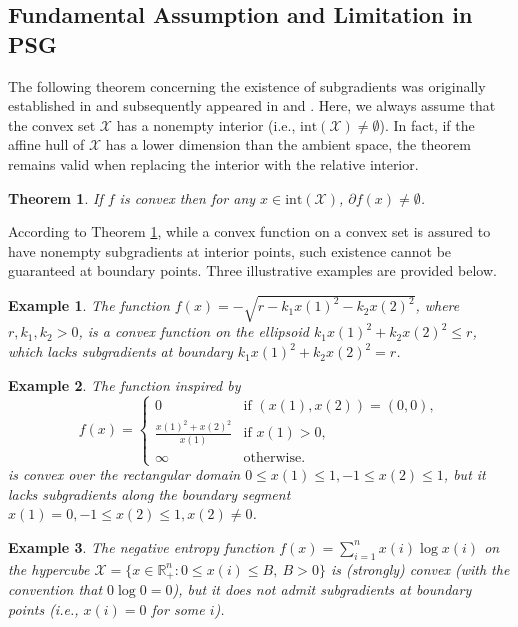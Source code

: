 \documentclass[sn-mathphys]{JORSC-jnl}%
\theoremstyle{thmstyleone}%
\newtheorem{theorem}{Theorem}[section]%
\newtheorem{example}{Example}%
\theoremstyle{thmstylethree}%
\def\R{{\mathbb R}}
\begin{document}
\subsection{Fundamental Assumption and Limitation in PSG}

The following theorem concerning the existence of subgradients was originally established in \cite[Theorem 23.4]{Rockafellar} and subsequently appeared in \cite[Proposition 1.1]{bubeck2015convex} and \cite[Theorem 3.1.15]{nesterov2018lectures}. Here, we always assume that the convex set $\mathcal{X}$ has a nonempty interior (i.e., $\text{int}(\mathcal{X}) \neq\emptyset$). In fact, if the affine hull of $\mathcal{X}$ has a lower dimension than the ambient space, the theorem remains valid when replacing the interior with the relative interior.

\begin{theorem}\label{thm1}
	If $f$ is convex then for any $x\in\text{int}(\mathcal{X})$, $\partial f(x)\neq\emptyset$.
\end{theorem}

According to Theorem \ref{thm1}, while a convex function on a convex set is assured to have nonempty subgradients at interior points, such existence cannot be guaranteed at boundary points. Three illustrative examples are provided below.

\begin{example}\label{e1}
	The function $f(x)=-\sqrt{r - k_1x(1)^2-k_2x(2)^2}$, where $r, k_1, k_2 > 0$, is a convex function on the ellipsoid $k_1x(1)^2+k_2x(2)^2\le r$, which lacks subgradients at boundary $k_1x(1)^2+k_2x(2)^2= r$.
\end{example}

\begin{example}\label{e2}
	The function inspired by \cite{Renegar}
	$$
	f(x) = 
	\begin{cases}
		0 & \text{if } (x(1), x(2)) = (0,0), \\
		\frac{x(1)^2 + x(2)^2}{x(1)} & \text{if } x(1) > 0, \\
		\infty & \text{otherwise}.
	\end{cases}
	$$
	is convex over the rectangular domain $0 \le x(1) \le 1, -1 \le x(2) \le 1$, but it lacks subgradients along the boundary segment  $ x(1) = 0, -1 \le x(2) \le 1, x(2) \neq 0$.
\end{example}

\begin{example}\label{e3}
	The negative entropy function $f(x)=\sum_{i=1}^{n} x(i) \log x(i)$ on the hypercube $\mathcal{X} = \{x \in\R_+^n: 0 \le x(i) \le B, ~B >0\}$ is (strongly) convex (with the convention that $0\log0=0$), but it does not admit subgradients at boundary points (i.e., $x(i) = 0$ for some $i$).
\end{example}
\end{document}
